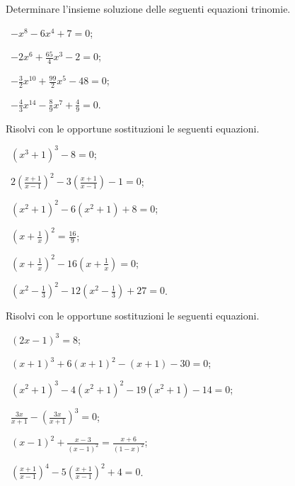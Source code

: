 \begin{esercizio}[\Ast]
 \label{ese:5.33}
Determinare l'insieme soluzione delle seguenti equazioni trinomie.
\begin{multicols}{2}
 \begin{enumeratea}
 \item~$-x^8-6x^4+7=0$;
 \item~$-2x^6+\frac{65} 4x^3-2=0$;
 \item~$-\frac 3 2x^{10}+\frac{99} 2x^5-48=0$;
 \item~$-\frac 4 3x^{14}-\frac 8 9x^7+\frac 4 9=0$.
 \end{enumeratea}
\end{multicols}
\end{esercizio}

\begin{esercizio}[\Ast]
 \label{ese:5.34}
Risolvi con le opportune sostituzioni le seguenti equazioni.
\begin{multicols}{2}
 \begin{enumeratea}
 \item~$\left(x^3+1\right)^3-8=0$;
 \item~$2\left(\frac{x+1}{x-1}\right)^2-3\left(\frac{x+1}{x-1}\right)-1=0$;
 \item~$\left(x^2+1\right)^2-6\left(x^2+1\right)+8=0$;
 \item~$\left(x+\frac 1 x\right)^2=\frac{16} 9$;
 \item~$\left(x+\frac 1 x\right)^2-16\left(x+\frac 1 x\right)=0$;
 \item~$\left(x^2-\frac 1 3\right)^2-12\left(x^2-\frac 1 3\right)+27=0$.
 \end{enumeratea}
\end{multicols}
\end{esercizio}

\begin{esercizio}[\Ast]
\label{ese:5.35}
Risolvi con le opportune sostituzioni le seguenti equazioni.
 \begin{enumeratea}
 \item~$(2x-1)^3=8$;
 \item~$(x+1)^3+6(x+1)^2-(x+1)-30=0$;
 \item~$(x^2+1)^3-4(x^2+1)^2-19(x^2+1)-14=0$;
 \item~$\frac{3x}{x+1}-\left(\frac{3x}{x+1}\right)^3=0$;
 \item~$\left(x-1\right)^2+\frac{x-3}{\left(x-1\right)^2}=\frac{x+6}{(1-x)^2}$;
 \item~$\left(\frac{x+1}{x-1}\right)^4-5\left(\frac{x+1}{x-1}\right)^2+4=0$.
 \end{enumeratea}
\end{esercizio}

